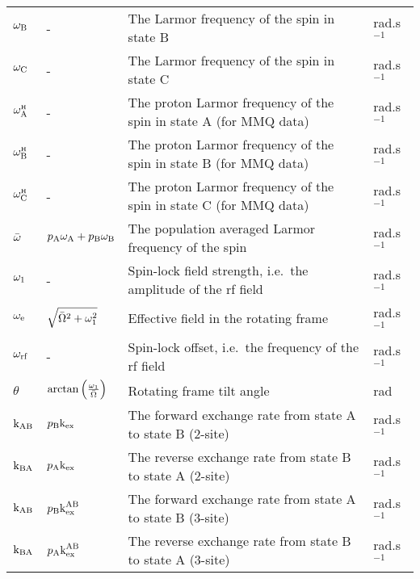 \begin{landscape}
\begin{center}
\begin{small}
\begin{longtable}{llll}
$\omega_\textrm{B}$          & -                              & The Larmor frequency of the spin in state B                                   & rad.s$^{-1}$ \\
$\omega_\textrm{C}$          & -                              & The Larmor frequency of the spin in state C                                   & rad.s$^{-1}$ \\
$\omega^{\scriptscriptstyle\mathrm{H}}_\textrm{A}$         & -                              & The proton Larmor frequency of the spin in state A (for MMQ data)             & rad.s$^{-1}$ \\
$\omega^{\scriptscriptstyle\mathrm{H}}_\textrm{B}$         & -                              & The proton Larmor frequency of the spin in state B (for MMQ data)             & rad.s$^{-1}$ \\
$\omega^{\scriptscriptstyle\mathrm{H}}_\textrm{C}$         & -                              & The proton Larmor frequency of the spin in state C (for MMQ data)             & rad.s$^{-1}$ \\
$\bar\omega$        & $p_\textrm{A}\omega_\textrm{A} + p_\textrm{B}\omega_\textrm{B}$      & The population averaged Larmor frequency of the spin                          & rad.s$^{-1}$ \\
$\omega_1$        & -                              & Spin-lock field strength, i.e.\ the amplitude of the rf field                 & rad.s$^{-1}$ \\
$\omega_\textrm{e}$          & $\sqrt{\bar\Omega^2 + \omega_1^2}$  & Effective field in the rotating frame                                   & rad.s$^{-1}$ \\
$\omega_\textrm{rf}$         & -                              & Spin-lock offset, i.e.\ the frequency of the rf field                         & rad.s$^{-1}$ \\
$\theta$           & $\arctan \left( \frac{\omega_1}{\bar\Omega} \right)$  & Rotating frame tilt angle                             & rad \\
$\textrm{k}_\textrm{AB}$             & $p_\textrm{B}\textrm{k}_\textrm{ex}$                      & The forward exchange rate from state A to state B (2-site)                    & rad.s$^{-1}$ \\
$\textrm{k}_\textrm{BA}$             & $p_\textrm{A}\textrm{k}_\textrm{ex}$                      & The reverse exchange rate from state B to state A (2-site)                    & rad.s$^{-1}$ \\
$\textrm{k}_\textrm{AB}$             & $p_\textrm{B}\textrm{k}_\textrm{ex}^\textrm{AB}$                    & The forward exchange rate from state A to state B (3-site)                    & rad.s$^{-1}$ \\
$\textrm{k}_\textrm{BA}$             & $p_\textrm{A}\textrm{k}_\textrm{ex}^\textrm{AB}$                    & The reverse exchange rate from state B to state A (3-site)                    & rad.s$^{-1}$ \\

\end{longtable}
\end{small}
\end{center}
\end{landscape}

